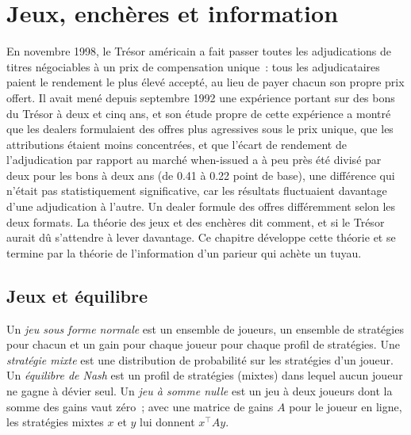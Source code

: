 \chapter{Jeux, enchères et information}\label{ch:qm:games-auctions-and-information}

En novembre 1998, le Trésor américain a fait passer toutes les adjudications de titres négociables à un prix de compensation unique~: tous les adjudicataires paient le rendement le plus élevé accepté, au lieu de payer chacun son propre prix offert.
Il avait mené depuis septembre 1992 une expérience portant sur des bons du Trésor à deux et cinq ans, et son étude propre de cette expérience a montré que les dealers formulaient des offres plus agressives sous le prix unique, que les attributions étaient moins
concentrées, et que l'écart de rendement de l'adjudication par rapport au marché when-issued a à peu près été divisé par deux pour les bons à deux ans (de 0.41 à 0.22 point de base), une différence qui n'était pas statistiquement
significative, car les résultats fluctuaient davantage d'une adjudication à l'autre. Un dealer formule des offres différemment selon les deux formats. La théorie des jeux et des enchères dit comment, et si le Trésor aurait dû
s'attendre à lever davantage. Ce chapitre développe cette théorie et se termine par la théorie de l'information d'un parieur qui achète un tuyau.

\section{Jeux et équilibre}

\begin{definition}\label{def:qm:games-auctions-and-information:game}
Un \emph{jeu sous forme normale} est un ensemble de joueurs, un ensemble de stratégies pour chacun et un gain pour chaque joueur pour chaque profil de stratégies. Une \emph{stratégie mixte} est une
distribution de probabilité sur les stratégies d'un joueur. Un \emph{équilibre de Nash} est un profil de stratégies (mixtes) dans lequel aucun joueur ne gagne à dévier seul. Un \emph{jeu à somme
nulle} est un jeu à deux joueurs dont la somme des gains vaut zéro~; avec une matrice de gains $A$ pour le joueur en ligne, les stratégies mixtes $x$ et $y$ lui donnent $x^\top Ay$.
\end{definition}

